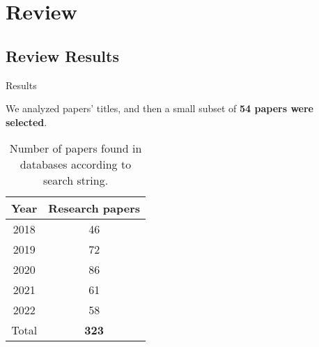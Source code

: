 \documentclass[10pt]{beamer}
\newcommand{\1}{
	\setbeamertemplate{background}{
		\texttt{[image: ../img/1]}
		\tikz[overlay] \fill[fill opacity=0.75,fill=white] (0,0) rectangle (-\paperwidth,\paperheight);
	}
}
\begin{document}
	\section{Review}
	
	
	\subsection{Review Results}
		

	\begin{frame}{Results}{}
		
		We analyzed papers' titles, and then  a small subset of \textbf{54 papers were selected}.
		
		\begin{table}[H]
			\begin{center}
				\caption{Number of papers found in databases according to search string. }
				\label{tab:number_papers}
				\setlength{\tabcolsep}{0.5em} %
				{\renewcommand{\arraystretch}{1.2}%
					\begin{tabular}{cc}
						\textbf{Year} & \textbf{Research papers} \\ \hline
						2018 & 46  \\
						2019 & 72  \\
						2020 & 86  \\
						2021 & 61  \\
						2022 & 58  \\ \hline
						Total & \textbf{323} \\
					\end{tabular}
				}
			\end{center}
		\end{table}
		
	\end{frame}
	
\end{document}
